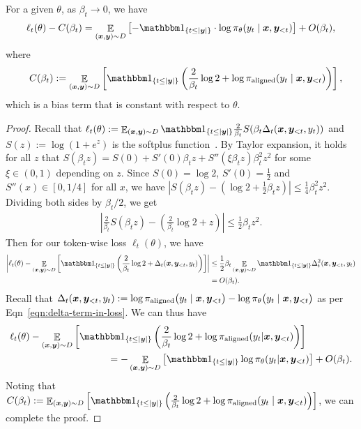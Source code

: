 \begin{theorem}
    For a given $\theta$, as $\beta_t \to 0$, we have
    \begin{equation}
        \ell_t(\theta) - C(\beta_t) =  \E_{(\bx,\by)\sim D} \left[ -\onec{t \le |\by|} \cdot \log \pi_{\theta}(y_t \mid \bx, \by_{<t}) \right] + O(\beta_t), 
    \end{equation}
where 
    \begin{equation}
    \quad C(\beta_t) := \E_{(\bx,\by)\sim D} \left[\onec{t \le |\by|} \left( \frac{2}{\beta_t} \log 2 + \log \pialigned(y_t \mid \bx, \by_{<t}) \right) \right],
    \end{equation}
which is a bias term that is constant with respect to $\theta.$
\end{theorem}
\begin{proof}
Recall that $\ell_t(\theta) :=  \mathop{\mathbb E}_{(\bx,\by)\sim D}  \onec{t \le |\by|} \frac{2}{\beta_t} S( \beta_t \Delta_t(\bx, \by_{<t}, y_t))$ and $S(z) := \log(1 + e^{z})$ is the softplus function~\citep{dugas2000incorporating}. By Taylor expansion, it holds for all $z$ that $S(\beta_t z) = S(0) + S'(0) \beta_t z + S''(\xi \beta_t z) \beta_t^2 z^2$ for some $\xi \in (0, 1)$ depending on $z$.
Since $S(0) = \log 2$, $S'(0) = \frac{1}{2}$ and $S''(x) \in [0, 1/4]$ for all $x$,
we have $|S(\beta_t z) - (\log 2 + \frac{1}{2} \beta_t z)| \le \frac{1}{4} \beta_t^2 z^2$.
Dividing both sides by $\beta_t/2$, we get
\begin{align}
    \left|\frac{2}{\beta_t}S(\beta_t z) - \left(\frac{2}{\beta_t}\log 2 +  z \right)\right| \le \frac{1}{2} \beta_t z^2.
\end{align}
Then for our token-wise loss $\ell_t(\theta)$, we have
\begin{align*}
    \left| \ell_t(\theta) 
    - \E_{(\bx,\by)\sim D}  \left[ \onec{t \le |\by|} \left( \frac{2}{\beta_t} \log 2 +  \Delta_t(\bx, \by_{<t}, y_t) \right)\right] \right|
    &\le \frac{1}{2} \beta_t \E_{(\bx,\by)\sim D}  \onec{t \le |\by|} \Delta_t^2 (\bx, \by_{<t}, y_t) \\
    & = O(\beta_t).
\end{align*}
Recall that $\Delta_t(\bm{x}, \bm{y}_{<t}, y_t) := \log \pi_{\mathrm{aligned}}\big(y_t \mid \bm{x}, \bm{y}_{<t} \big) - \log \pi_{\theta}\big(y_t \mid \bm{x}, \bm{y}_{<t} \big)$ as per Eqn~\ref{eqn:delta-term-in-loss}. We can thus have
\begin{equation}
\begin{aligned}
    \ell_t(\theta) 
    &- \E_{(\bx,\by)\sim D}  \left[ \onec{t \le |\by|} \left( \frac{2}{\beta_t} \log 2 +   \log \pialigned(y_t |  \bx, \by_{< t}) \right)\right] 
     \\ &\qquad\qquad\qquad\qquad
    = - \E_{(\bx,\by)\sim D}  \left[ \onec{t \le |\by|}      \log \pi_{\theta}(y_t |  \bx, \by_{< t}) \right] + O(\beta_t).
\end{aligned}
\end{equation}
Noting that $C(\beta_t) := \E_{(\bx,\by)\sim D} \left[\onec{t \le |\by|} \left( \frac{2}{\beta_t} \log 2 + \log \pialigned(y_t \mid \bx, \by_{<t}) \right) \right]$, we can complete the proof.
\end{proof}
